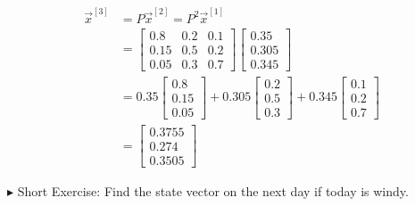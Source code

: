 \begin{solution}
\begin{align*}
\vec{x}^{[3]} &= P\vec{x}^{[2]} = P^2\vec{x}^{[1]} \\
&=
\begin{bmatrix}
0.8 & 0.2 & 0.1\\
0.15 & 0.5 & 0.2 \\
0.05 & 0.3 & 0.7
\end{bmatrix}   
\begin{bmatrix}
0.35 \\
0.305 \\
0.345
\end{bmatrix} \\
&= 0.35
\begin{bmatrix}
0.8 \\
0.15 \\
0.05
\end{bmatrix}
+ 0.305
\begin{bmatrix}
0.2 \\
0.5 \\
0.3
\end{bmatrix}
+ 0.345
\begin{bmatrix}
0.1 \\
0.2 \\
0.7
\end{bmatrix} \\
&=
\begin{bmatrix}
0.3755\\ 
0.274\\
0.3505
\end{bmatrix}
\end{align*}
\end{solution}
$\blacktriangleright$ Short Exercise: Find the state vector on the next day if today is windy.\footnotemark

